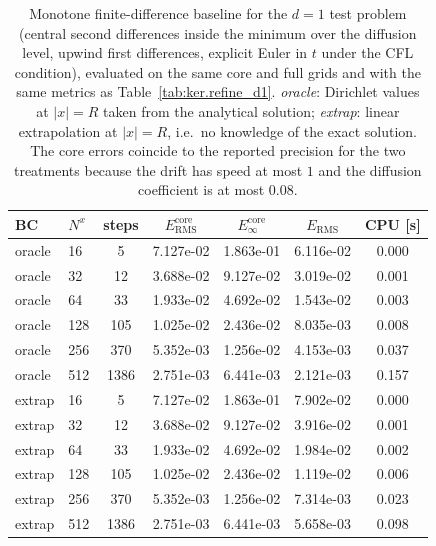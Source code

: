 \begin{table}[tb]
  \centering
  \small
  \caption{Monotone finite-difference baseline for the $d=1$ test problem (central second differences inside the minimum over the diffusion level, upwind first differences, explicit Euler in $t$ under the CFL condition), evaluated on the same core and full grids and with the same metrics as Table~\ref{tab:ker.refine_d1}. \emph{oracle}: Dirichlet values at $|x|=R$ taken from the analytical solution; \emph{extrap}: linear extrapolation at $|x|=R$, i.e.\ no knowledge of the exact solution. The core errors coincide to the reported precision for the two treatments because the drift has speed at most $1$ and the diffusion coefficient is at most $0.08$.}
  \label{tab:fd.compare_d1}
  \begin{tabular}{llccccc}
    \toprule
    BC & $N^x$ & steps & $E_{\mathrm{RMS}}^{\mathrm{core}}$ & $E_{\infty}^{\mathrm{core}}$ & $E_{\mathrm{RMS}}$ & CPU [s] \\
    \midrule
    oracle & 16 & 5 & 7.127e-02 & 1.863e-01 & 6.116e-02 & 0.000 \\
    oracle & 32 & 12 & 3.688e-02 & 9.127e-02 & 3.019e-02 & 0.001 \\
    oracle & 64 & 33 & 1.933e-02 & 4.692e-02 & 1.543e-02 & 0.003 \\
    oracle & 128 & 105 & 1.025e-02 & 2.436e-02 & 8.035e-03 & 0.008 \\
    oracle & 256 & 370 & 5.352e-03 & 1.256e-02 & 4.153e-03 & 0.037 \\
    oracle & 512 & 1386 & 2.751e-03 & 6.441e-03 & 2.121e-03 & 0.157 \\
    \midrule
    extrap & 16 & 5 & 7.127e-02 & 1.863e-01 & 7.902e-02 & 0.000 \\
    extrap & 32 & 12 & 3.688e-02 & 9.127e-02 & 3.916e-02 & 0.001 \\
    extrap & 64 & 33 & 1.933e-02 & 4.692e-02 & 1.984e-02 & 0.002 \\
    extrap & 128 & 105 & 1.025e-02 & 2.436e-02 & 1.119e-02 & 0.006 \\
    extrap & 256 & 370 & 5.352e-03 & 1.256e-02 & 7.314e-03 & 0.023 \\
    extrap & 512 & 1386 & 2.751e-03 & 6.441e-03 & 5.658e-03 & 0.098 \\
    \bottomrule
  \end{tabular}
\end{table}
